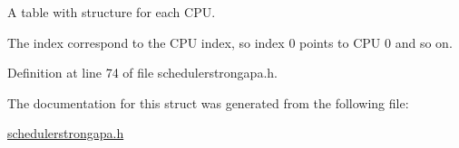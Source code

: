 A table with structure for each C\+PU. 

The index correspond to the C\+PU index, so index 0 points to C\+PU 0 and so on. 

Definition at line 74 of file schedulerstrongapa.\+h.



The documentation for this struct was generated from the following file\+:\begin{DoxyCompactItemize}
\item 
\hyperlink{schedulerstrongapa_8h}{schedulerstrongapa.\+h}\end{DoxyCompactItemize}
